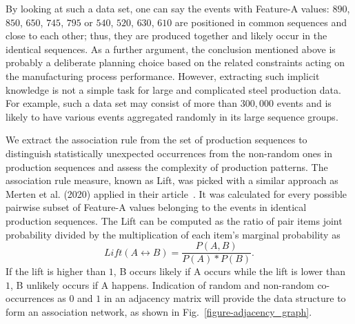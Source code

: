 By looking at such a data set, one can say the events with Feature-A values: $890$, $850$, $650$, $745$, $795$ or $540$, $520$, $630$, $610$ are positioned in common sequences and close to each other; thus, they are produced together and likely occur in the identical sequences. As a further argument, the conclusion mentioned above is probably a deliberate planning choice based on the related constraints acting on the manufacturing process performance. However, extracting such implicit knowledge is not a simple task for large and complicated steel production data. For example, such a data set may consist of more than $300,000$ events and is likely to have various events aggregated randomly in its large sequence groups.

We extract the association rule from the set of production sequences to distinguish statistically unexpected occurrences from the non-random ones in production sequences and assess the complexity of production patterns. The association rule measure, known as Lift, was picked with a similar approach as Merten et al. (2020) applied in their article~\cite{MERTEN2020}. It was calculated for every possible pairwise subset of Feature-A values belonging to the events in identical production sequences. The Lift can be computed as the ratio of pair items joint probability divided by the multiplication of each item's marginal probability as
\begin{equation} %
	Lift(A\leftrightarrow B)=\frac{P(A,B)}{P(A)*P(B)}.
	\label{lift}
\end{equation}
If the lift is higher than $1$, B occurs likely if A occurs while the lift is lower than $1$, B unlikely occurs if A happens. Indication of random and non-random co-occurrences as $0$ and $1$ in an adjacency matrix will provide the data structure to form an association network, as shown in Fig.~\ref{figure-adjacency_graph}.

